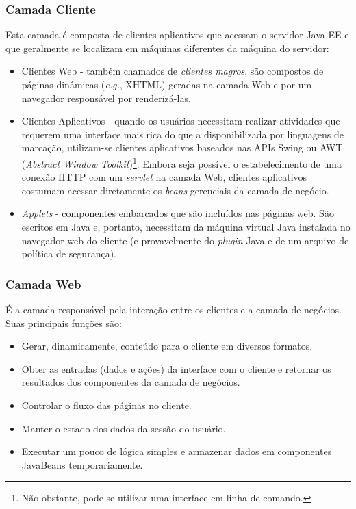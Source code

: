 \documentclass[
  10.5pt,				  %
	openright,			%
	twoside,			  %
  a5paper,
  chapter=TITLE,	%
	section=TITLE,	%
  hyphens,        %
	english,        %
	brazil          %
]{abntex2}
\begin{document}
\subsubsection{Camada Cliente}

Esta camada é composta de clientes aplicativos que acessam o servidor Java EE e que geralmente se localizam em máquinas diferentes da máquina do servidor:

\begin{itemize}
  \item Clientes Web - também chamados de \emph{clientes magros}, são compostos de páginas dinâmicas (\emph{e.g.}, XHTML) geradas na camada Web e por um navegador responsável por renderizá-las.
  \item Clientes Aplicativos - quando os usuários necessitam realizar atividades que requerem uma interface mais rica do que a disponibilizada por linguagens de marcação, utilizam-se clientes aplicativos baseados nas APIs Swing ou AWT (\emph{Abstract Window Toolkit})\footnote{Não obstante, pode-se utilizar uma interface em linha de comando.}. Embora seja possível o estabelecimento de uma conexão HTTP com um \emph{servlet} na camada Web, clientes aplicativos costumam acessar diretamente os \emph{beans} gerenciais da camada de negócio.
  \item \emph{Applets} - componentes embarcados que são incluídos nas páginas web. São escritos em Java e, portanto, necessitam da máquina virtual Java instalada no navegador web do cliente (e provavelmente do \emph{plugin} Java e de um arquivo de política de segurança).
\end{itemize}

\subsubsection{Camada Web}\label{sec:camada-web}

É a camada responsável pela interação entre os clientes e a camada de negócios. Suas principais funções são:
\begin{itemize}
  \item Gerar, dinamicamente, conteúdo para o cliente em diversos formatos.
  \item Obter as entradas (dados e ações) da interface com o cliente e retornar os resultados dos componentes da camada de negócios.
  \item Controlar o fluxo das páginas no cliente.
  \item Manter o estado dos dados da sessão do usuário.
  \item Executar um pouco de lógica simples e armazenar dados em componentes JavaBeans temporariamente.
\end{itemize}
\end{document}
